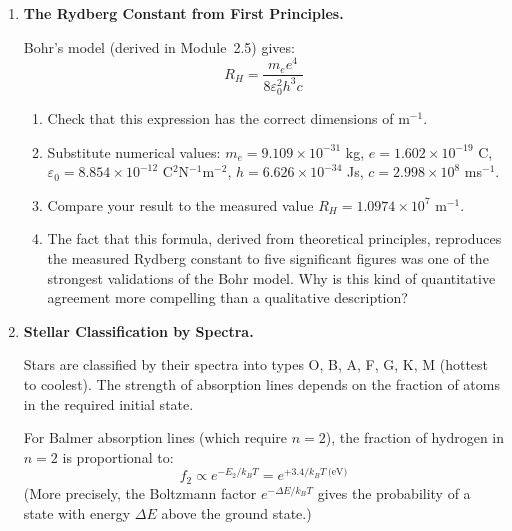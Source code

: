 \documentclass[12pt, a4paper]{book}
\begin{document}
\begin{deepbox}
\begin{enumerate}[label=\textbf{D\arabic*.}]

  \item \textbf{The Rydberg Constant from First Principles.}

        Bohr's model (derived in Module~2.5) gives:
        \[
          R_H = \frac{m_e e^4}{8 \varepsilon_0^2 h^3 c}
        \]
        \begin{enumerate}[label=(\alph*)]
          \item Check that this expression has the correct
                dimensions of m$^{-1}$.
          \item Substitute numerical values:
                $m_e = 9.109\times10^{-31}$ kg,
                $e = 1.602\times10^{-19}$ C,
                $\varepsilon_0 = 8.854\times10^{-12}$ C$^2$N$^{-1}$m$^{-2}$,
                $h = 6.626\times10^{-34}$ Js,
                $c = 2.998\times10^8$ ms$^{-1}$.
          \item Compare your result to the measured value
                $R_H = 1.0974\times10^7$ m$^{-1}$.
          \item The fact that this formula, derived from
                theoretical principles, reproduces the
                measured Rydberg constant to five significant
                figures was one of the strongest validations
                of the Bohr model.
                Why is this kind of quantitative agreement
                more compelling than a qualitative description?
        \end{enumerate}

  \item \textbf{Stellar Classification by Spectra.}

        Stars are classified by their spectra into types
        O, B, A, F, G, K, M (hottest to coolest).
        The strength of absorption lines depends on
        the fraction of atoms in the required initial state.

        For Balmer absorption lines (which require $n=2$),
        the fraction of hydrogen in $n=2$ is proportional to:
        \[
          f_2 \propto e^{-E_2/k_BT} = e^{+3.4/k_BT\ \text{(eV)}}
        \]
        (More precisely, the Boltzmann factor $e^{-\Delta E/k_BT}$
        gives the probability of a state with energy $\Delta E$
        above the ground state.)


\end{enumerate}
\end{deepbox}
\end{document}
